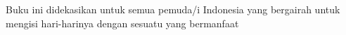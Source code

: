 Buku ini didekasikan untuk semua pemuda/i Indonesia yang bergairah untuk mengisi hari-harinya dengan sesuatu yang bermanfaat

